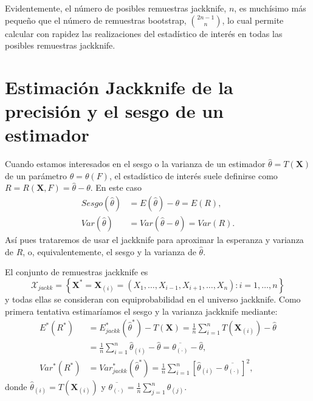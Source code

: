 \documentclass[
]{book}
\renewcommand{\mathbf}[1]{\symbf{#1}}
\theoremstyle{break}
\theoremstyle{nonumberplain}
\begin{document}
Evidentemente, el número de posibles remuestras jackknife, \(n\), es
muchísimo más pequeño que el número de remuestras bootstrap,
\(\binom{2n-1}{n}\), lo cual permite calcular con rapidez las realizaciones
del estadístico de interés en todas las posibles remuestras jackknife.

\section{Estimación Jackknife de la precisión y el sesgo de un estimador}\label{estimaciuxf3n-jackknife-de-la-precisiuxf3n-y-el-sesgo-de-un-estimador}

Cuando estamos interesados en el sesgo o la varianza de un estimador \(\hat{\theta}=T \left( \mathbf{X} \right)\) de un parámetro \(\theta =\theta \left( F \right)\), el estadístico de interés suele definirse como \(R=R\left( \mathbf{X},F \right) =\hat{\theta}-\theta\).
En este caso
\[\begin{aligned}
Sesgo\left( \hat{\theta} \right) &= E\left( \hat{\theta} \right) -\theta
=E\left( R \right), \\
Var\left( \hat{\theta} \right) &= Var\left( \hat{\theta}-\theta \right)
=Var\left( R \right).
\end{aligned}\]
Así pues trataremos de usar el jackknife para aproximar la esperanza y varianza de \(R\), o, equivalentemente, el sesgo y la varianza de \(\hat{\theta}\).

El conjunto de remuestras jackknife es
\[\mathcal{X}_{jackk}=\left\{ \mathbf{X}^{\ast}=
\mathbf{X}_{(i)}=\left( X_1,\ldots ,X_{i-1},X_{i+1},\ldots
,X_n \right) : i=1,\ldots ,n\right\}\]
y todas ellas se consideran con equiprobabilidad en el universo jackknife.
Como primera tentativa estimaríamos el sesgo y la varianza jackknife mediante:
\[\begin{aligned}
E^{\ast}\left( R^{\ast} \right) 
&= E_{jackk}^{\ast}\left( \hat{\theta}^{\ast} \right) - T \left( \mathbf{X} \right) 
= \frac{1}{n}\sum_{i=1}^{n}T \left( \mathbf{X}_{(i)} \right) - \hat{\theta} \\
&= \frac{1}{n}\sum_{i=1}^{n}\hat \theta_{(i)} - \hat{\theta} 
= \overline{\theta_{(\cdot)}}-\hat{\theta}, \\
Var^{\ast}\left( R^{\ast} \right) 
&= Var_{jackk}^{\ast}\left( \hat{\theta}^{\ast} \right) 
= \frac{1}{n}\sum_{i=1}^{n}\left[ \hat \theta_{(i)} 
- \overline{\theta_{(\cdot)}}\right]^2,
\end{aligned}\]
donde \(\hat \theta_{(i)} = T \left( \mathbf{X}_{(i)} \right)\) y \(\overline{\theta_{(\cdot)}} = \frac{1}{n}\sum_{j=1}^{n}\hat \theta_{(j)}\).
\end{document}

